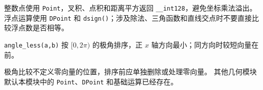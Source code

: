 整数点使用 \texttt{Point}，叉积、点积和距离平方返回 \texttt{\_\_int128}，避免坐标乘法溢出。
浮点运算使用 \texttt{DPoint} 和 \texttt{dsign()}；涉及除法、三角函数和直线交点时不要直接比较浮点数是否相等。

\texttt{angle\_less(a,b)} 按 \([0,2\pi)\) 的极角排序，正 \(x\) 轴方向最小；同方向时较短向量在前。

\begin{icpcwarning}[零向量]
  极角比较不定义零向量的位置，排序前应单独删除或处理零向量。
  其他几何模块默认本模块中的 \texttt{Point}、\texttt{DPoint} 和基础运算已经存在。
\end{icpcwarning}
